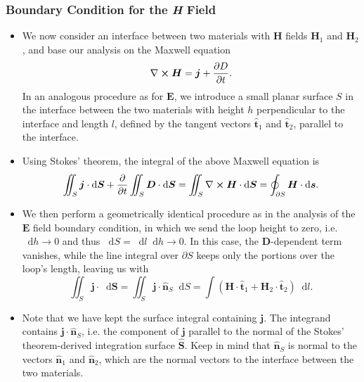 \documentclass[11pt, a4paper]{article}
\newcommand{\diff}{\mathop{}\!\mathrm{d}} %
\renewcommand{\vec}[1]{\bm{#1}} %
\newcommand{\uvec}[1]{\hat{\vec{#1}}} %
\newcommand{\E}{\vec{E}} %
\newcommand{\D}{\vec{D}}  %
\renewcommand{\H}{\vec{H}}  %
\renewcommand{\j}{\vec{j}}  %
\renewcommand{\curl}{\nabla \cross}
\begin{document}
\subsubsection{Boundary Condition for the \textit{H} Field}
\begin{itemize}
	\item We now consider an interface between two materials with $ \H $ fields $ \H_{1} $ and $ \H_{2} $, and base our analysis on the Maxwell equation
	\begin{equation*}
		\curl \H = \j + \pdv{D}{t}.
	\end{equation*}
	In an analogous procedure as for $ \E $, we introduce a small planar surface $ S $ in the interface between the two materials with height $ h $ perpendicular to the interface and length $ l $, defined by the tangent vectors $ \uvec{t}_{1} $ and $ \uvec{t}_{2} $, parallel to the interface.
	
	\item Using Stokes' theorem, the integral of the above Maxwell equation is
    \begin{equation*}
        \iint_{S} \j \cdot \diff \vec{S} + \pdv{t} \iint_{S} \D \cdot \diff \vec{S} = \iint_{S} \curl \H \cdot \diff \vec{S} = \oint_{\partial S} \H \cdot \diff \vec{s}.
	\end{equation*}

    \item We then perform a geometrically identical procedure as in the analysis of the $ \E $ field boundary condition, in which we send the loop height to zero, i.e. $ \diff h \to 0 $ and thus $ \diff S = \diff l \diff h \to 0 $. In this case, the $ \D $-dependent term vanishes, while the line integral over $ \partial S $ keeps only the portions over the loop's length, leaving us with
	\begin{equation*}
        \iint_{S} \j \cdot \diff \vec{S} = \iint_{S} \j \cdot \uvec{n}_{S} \diff S = \int (\H \cdot \uvec{t}_{1} + \H_{2}\cdot \uvec{t}_{2}) \diff l.
	\end{equation*}
    
    \item Note that we have kept the surface integral containing $ \j $. The integrand contains $ \j \cdot \uvec{n}_{S} $, i.e. the component of $ \j $ parallel to the normal of the Stokes' theorem-derived integration surface $ \uvec{S} $. Keep in mind that $ \uvec{n}_{S} $ is normal to the vectors $ \uvec{n}_{1} $ and $ \uvec{n}_{2} $, which are the normal vectors to the interface between the two materials.


\end{itemize}
\end{document}
